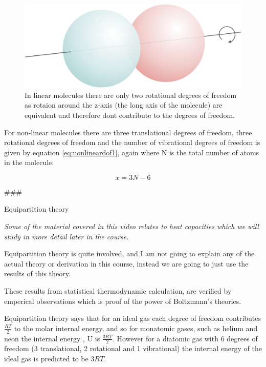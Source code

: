 \documentclass[
]{book}
\begin{document}
\begin{figure}

{\centering \includegraphics[width=0.8\linewidth]{images/linear} 

}

\caption{In linear molecules there are only two rotational degrees of freedom as rotaion around the z-axis (the long axis of the molecule) are equivalent and therefore dont contribute to the degrees of freedom.}\label{fig:linear1}
\end{figure}

For non-linear molecules there are three translational degrees of freedom, three rotational degrees of freedom and the number of vibrational degrees of freedom is given by equation \eqref{eq:nonlineardof1}, again where N is the total number of atoms in the molecule:

\begin{equation}
x = 3N-6
\label{eq:nonlineardof1}
\end{equation}

\#\#\#

Equipartition theory

\emph{Some of the material covered in this video relates to heat capacities which we will study in more detail later in the course.}

Equipartition theory is quite involved, and I am not going to explain any of the actual theory or derivation in this course, instead we are going to just use the results of this theory.

These results from statistical thermodynamic calculation, are verified by emperical observations which is proof of the power of Boltzmann's theories.

Equipartition theory says that for an ideal gas each degree of freedom contributes \(\frac{RT}{2}\) to the molar internal energy, and so for monatomic gases, such as helium and neon the internal energy , U is \(\frac{3RT}{2}\). However for a diatomic gas with 6 degrees of freedom (3 translational, 2 rotational and 1 vibrational) the internal energy of the ideal gas is predicted to be \(3RT\).
\end{document}
